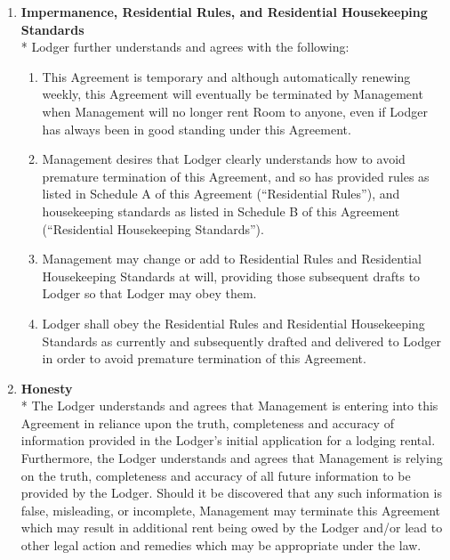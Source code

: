 \documentclass[12pt,letterpaper]{article}
\newcommand{\lodger}{Lodger}
\newcommand{\rules}{Residential Rules}
\newcommand{\standards}{Residential Housekeeping Standards}
\newcommand{\management}{Management}
\newcommand{\room}{Room}
\begin{document}
\begin{enumerate}
		\item \textbf{Impermanence, \rules{}, and \standards{}}\\*
			\lodger{} further understands and agrees with the following: 
			\begin{enumerate}
				\item This Agreement is temporary and although automatically renewing weekly, this Agreement will eventually be terminated by \management{} when \management{} will no longer rent \room{} to anyone, even if \lodger{} has always been in good standing under this Agreement. 
				\item \management{} desires that \lodger{} clearly understands how to avoid premature termination of this Agreement, and so has provided rules as listed in Schedule A of this Agreement (``\rules{}''), and housekeeping standards as listed in Schedule B of this Agreement (``\standards{}''). 
				\item \management{} may change or add to \rules{} and \standards{} at will, providing those subsequent drafts to \lodger{} so that \lodger{} may obey them. 
				\item \lodger{} shall obey the \rules{} and \standards{} as currently and subsequently drafted and delivered to \lodger{} in order to avoid premature termination of this Agreement.
			\end{enumerate}

		\item \textbf{Honesty}\\*
			The \lodger{} understands and agrees that \management{} is entering into this Agreement in reliance upon the truth, completeness and accuracy of information provided in the \lodger{}'s initial application for a lodging rental. Furthermore, the \lodger{} understands and agrees that \management{} is relying on the truth, completeness and accuracy of all future information to be provided by the \lodger{}. Should it be discovered that any such information is false, misleading, or incomplete, \management{} may terminate this Agreement which may result in additional rent being owed by the \lodger{} and/or lead to other legal action and remedies which may be appropriate under the law. 

	\end{enumerate}
\end{document}
